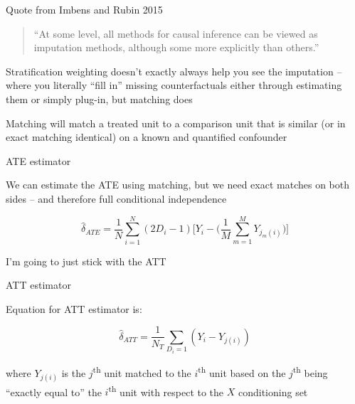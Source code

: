 \documentclass{beamer}
\begin{document}
\begin{frame}{Quote from Imbens and Rubin 2015}

\begin{quote}
``At some level, all methods for causal inference can be viewed as imputation methods, although some more explicitly than others.''
\end{quote}

\bigskip

Stratification weighting doesn't exactly always help you see the imputation -- where you literally ``fill in'' missing counterfactuals either through estimating them or simply plug-in, but matching does

\bigskip

Matching will match a treated unit to a comparison unit that is similar (or in exact matching identical) on a known and quantified confounder



\end{frame}

\begin{frame}{ATE estimator}

We can estimate the ATE using matching, but we need exact matches on both sides -- and therefore full conditional independence

\bigskip

\begin{equation}
\widehat{\delta}_{ATE} = \dfrac{1}{N} \sum_{i=1}^N (2D_i - 1) \bigg [ Y_i - \bigg ( \dfrac{1}{M} \sum_{m=1}^M Y_{j_m(i)} \bigg ) \bigg ]
\label{eq:ate_match}
\end{equation}

\bigskip

I'm going to just stick with the ATT

\end{frame}


\begin{frame}{ATT estimator}

Equation for ATT estimator is:

\begin{equation}
\widehat{\delta}_{ATT} = \dfrac{1}{N_T} \sum_{D_i=1}(Y_i - Y_{j(i)})
\label{eq:att_simplematch}
\end{equation}

where $Y_{j(i)}$ is the $j$\textsuperscript{th} unit matched to the $i$\textsuperscript{th} unit based on the $j$\textsuperscript{th} being ``exactly equal to'' the $i$\textsuperscript{th} unit with respect to the $X$ conditioning set

\end{frame}
\end{document}
